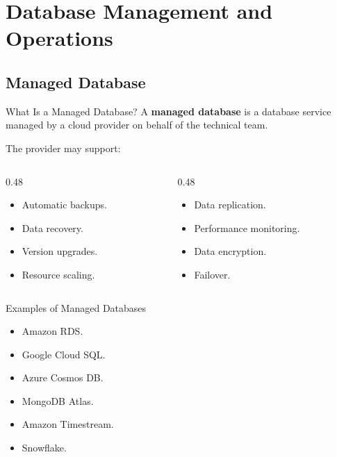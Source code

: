 \documentclass[aspectratio=169,11pt]{beamer}
\newcommand{\keyword}[1]{\textcolor{accent}{\textbf{#1}}}
\newcommand{\kw}[1]{\keyword{#1}}
\newcommand{\smallitem}{\setlength{\itemsep}{2pt}\setlength{\parskip}{0pt}}
\begin{document}
\section{Database Management and Operations}
\subsection{Managed Database}

\begin{frame}{What Is a Managed Database?}
A \kw{managed database} is a database service managed by a cloud provider on behalf of the technical team.

\vspace{2mm}
The provider may support:
\begin{columns}[T]
\begin{column}{0.48\textwidth}
\begin{itemize}
  \smallitem
  \item Automatic backups.
  \item Data recovery.
  \item Version upgrades.
  \item Resource scaling.
\end{itemize}
\end{column}
\begin{column}{0.48\textwidth}
\begin{itemize}
  \smallitem
  \item Data replication.
  \item Performance monitoring.
  \item Data encryption.
  \item Failover.
\end{itemize}
\end{column}
\end{columns}
\end{frame}

\begin{frame}{Examples of Managed Databases}
\begin{itemize}
  \smallitem
  \item Amazon RDS.
  \item Google Cloud SQL.
  \item Azure Cosmos DB.
  \item MongoDB Atlas.
  \item Amazon Timestream.
  \item Snowflake.
\end{itemize}
\end{frame}
\end{document}
